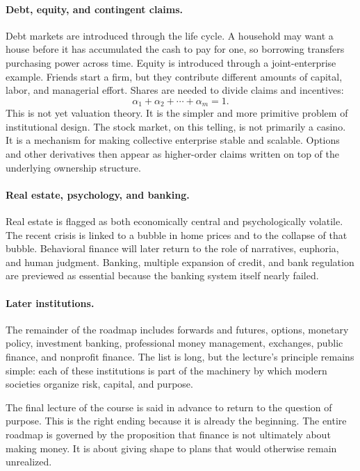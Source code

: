 \paragraph{Debt, equity, and contingent claims.}
Debt markets are introduced through the life cycle. A household may want a house before it has accumulated the cash to pay for one, so borrowing transfers purchasing power across time. Equity is introduced through a joint-enterprise example. Friends start a firm, but they contribute different amounts of capital, labor, and managerial effort. Shares are needed to divide claims and incentives:
\begin{equation}
\alpha_1+\alpha_2+\cdots+\alpha_m=1.
\end{equation}
This is not yet valuation theory. It is the simpler and more primitive problem of institutional design. The stock market, on this telling, is not primarily a casino. It is a mechanism for making collective enterprise stable and scalable. Options and other derivatives then appear as higher-order claims written on top of the underlying ownership structure.

\paragraph{Real estate, psychology, and banking.}
Real estate is flagged as both economically central and psychologically volatile. The recent crisis is linked to a bubble in home prices and to the collapse of that bubble. Behavioral finance will later return to the role of narratives, euphoria, and human judgment. Banking, multiple expansion of credit, and bank regulation are previewed as essential because the banking system itself nearly failed.

\paragraph{Later institutions.}
The remainder of the roadmap includes forwards and futures, options, monetary policy, investment banking, professional money management, exchanges, public finance, and nonprofit finance. The list is long, but the lecture's principle remains simple: each of these institutions is part of the machinery by which modern societies organize risk, capital, and purpose.

The final lecture of the course is said in advance to return to the question of purpose. This is the right ending because it is already the beginning. The entire roadmap is governed by the proposition that finance is not ultimately about making money. It is about giving shape to plans that would otherwise remain unrealized.

